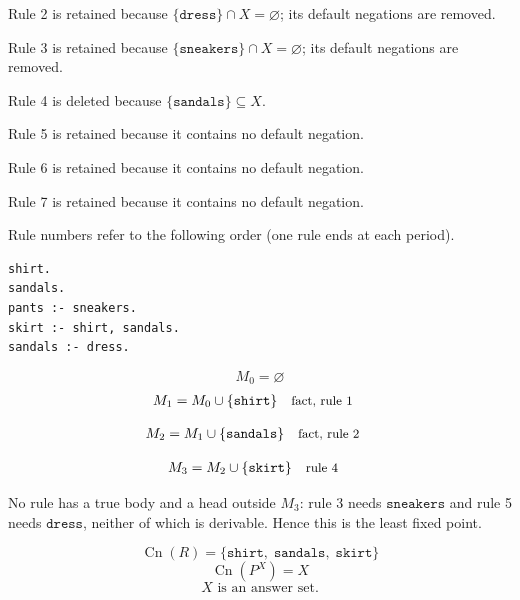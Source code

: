 \documentclass[a4paper,11pt]{article}
\newif\ifexplain
\newcommand{\explain}[1]{\ifexplain\begin{erklbox}#1\end{erklbox}\fi}
\newcommand{\why}[1]{\text{\small #1}}
\newcommand{\at}[1]{\texttt{#1}}
\begin{document}
Rule 2 is retained because $\{\at{dress}\}\cap X=\varnothing$; its default negations are removed.

Rule 3 is retained because $\{\at{sneakers}\}\cap X=\varnothing$; its default negations are removed.

Rule 4 is deleted because $\{\at{sandals}\}\subseteq X$.

Rule 5 is retained because it contains no default negation.

Rule 6 is retained because it contains no default negation.

Rule 7 is retained because it contains no default negation.

Rule numbers refer to the following order (one rule ends at each period).
\begin{small}
\begin{verbatim}
shirt.
sandals.
pants :- sneakers.
skirt :- shirt, sandals.
sandals :- dress.
\end{verbatim}
\end{small}
\explain{Beim Redukt bleibt die Kandidatenmenge fest. Wir entscheiden zuerst, welche Regeln wegfallen. Erst danach berechnen wir aus den verbleibenden positiven Regeln die kleinste abgeschlossene Menge. Ein Modell allein reicht nicht: Diese Menge muss genau der Kandidat sein.}
\[
M_0=\varnothing
\]
\begin{align*}
M_{1} &= M_{0}\cup \{\at{shirt}\} && \why{fact, rule 1}
\end{align*}
\explain{Diese Regel hat keinen Körper. Ihr Kopf $\at{shirt}$ ist damit ein Fakt und muss in die Menge.}
\begin{align*}
M_{2} &= M_{1}\cup \{\at{sandals}\} && \why{fact, rule 2}
\end{align*}
\explain{Diese Regel hat keinen Körper. Ihr Kopf $\at{sandals}$ ist damit ein Fakt und muss in die Menge.}
\begin{align*}
M_{3} &= M_{2}\cup \{\at{skirt}\} && \why{rule 4}
\end{align*}
\explain{Für $\at{skirt}$ brauchen wir $\at{shirt}$ und $\at{sandals}$. Weil diese Voraussetzungen bereits hergeleitet sind, dürfen wir den Regelkopf jetzt aufnehmen und alle bisherigen Atome behalten; bei einer fehlenden Voraussetzung würde diese Regel dagegen noch nichts beitragen.}
No rule has a true body and a head outside $M_{3}$: rule 3 needs $\at{sneakers}$ and rule 5 needs $\at{dress}$, neither of which is derivable. Hence this is the least fixed point.
\explain{Regel 3 liefert $\at{sneakers}$ nie, weil im Redukt keine Regel mehr den Kopf $\at{sneakers}$ trägt. Regel 5 scheitert am fehlenden $\at{dress}$.}
\[
\operatorname{Cn}(R)=\{\at{shirt},\;\at{sandals},\;\at{skirt}\}
\]
\[
\operatorname{Cn}(P^X)=X
\]
\[
\boxed{X\text{ is an answer set.}}
\]
\end{document}
